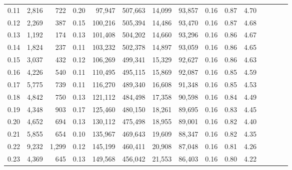 \begin{tabular}{rrrcrrrrrrrrrrr}
0.11 &   2,816 &     722 &                                       0.20 &   97,947 &  507,663 &   14,099 &  93,857 &  0.16 &  0.87 &                         4.70 \\
0.12 &   2,269 &     387 &                                       0.15 &  100,216 &  505,394 &   14,486 &  93,470 &  0.16 &  0.87 &                         4.68 \\
0.13 &   1,192 &     174 &                                       0.13 &  101,408 &  504,202 &   14,660 &  93,296 &  0.16 &  0.86 &                         4.67 \\
0.14 &   1,824 &     237 &                                       0.11 &  103,232 &  502,378 &   14,897 &  93,059 &  0.16 &  0.86 &                         4.65 \\
0.15 &   3,037 &     432 &                                       0.12 &  106,269 &  499,341 &   15,329 &  92,627 &  0.16 &  0.86 &                         4.63 \\
0.16 &   4,226 &     540 &                                       0.11 &  110,495 &  495,115 &   15,869 &  92,087 &  0.16 &  0.85 &                         4.59 \\
0.17 &   5,775 &     739 &                                       0.11 &  116,270 &  489,340 &   16,608 &  91,348 &  0.16 &  0.85 &                         4.53 \\
0.18 &   4,842 &     750 &                                       0.13 &  121,112 &  484,498 &   17,358 &  90,598 &  0.16 &  0.84 &                         4.49 \\
0.19 &   4,348 &     903 &                                       0.17 &  125,460 &  480,150 &   18,261 &  89,695 &  0.16 &  0.83 &                         4.45 \\
0.20 &   4,652 &     694 &                                       0.13 &  130,112 &  475,498 &   18,955 &  89,001 &  0.16 &  0.82 &                         4.40 \\
0.21 &   5,855 &     654 &                                       0.10 &  135,967 &  469,643 &   19,609 &  88,347 &  0.16 &  0.82 &                         4.35 \\
0.22 &   9,232 &   1,299 &                                       0.12 &  145,199 &  460,411 &   20,908 &  87,048 &  0.16 &  0.81 &                         4.26 \\
0.23 &   4,369 &     645 &                                       0.13 &  149,568 &  456,042 &   21,553 &  86,403 &  0.16 &  0.80 &                         4.22 \\

\end{tabular}
